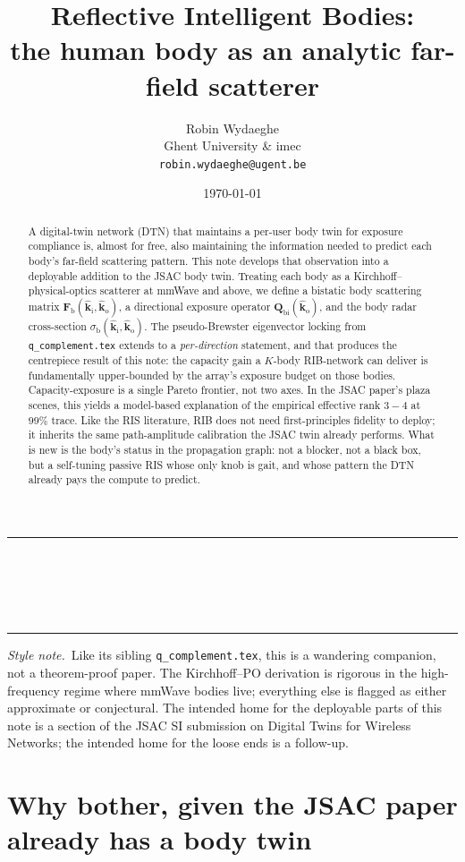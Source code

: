 \documentclass[11pt,a4paper]{article}
\title{\textbf{Reflective Intelligent Bodies:\\
the human body as an analytic far-field scatterer}}
\author{Robin Wydaeghe\\
 Ghent University \& imec\\
 \texttt{robin.wydaeghe@ugent.be}}
\date{\today}
\makeatletter
\theoremstyle{definition}
\newcommand{\kin}{\hat{\bm{k}}_{\mathrm{i}}}
\newcommand{\kout}{\hat{\bm{k}}_{\mathrm{o}}}
\newcommand{\Frib}{\mathbf{F}_{\mathrm{b}}}
\newcommand{\sigb}{\sigma_{\mathrm{b}}}
\newcommand{\Qbist}{\mathbf{Q}_{\mathrm{bi}}}
\renewcommand{\maketitle}{%
  \thispagestyle{plain}%
  \begin{center}
    \rule{\linewidth}{1pt}\\[0.4em]
    {\LARGE\bfseries \@title}\\[0.5em]
    {\large \@author}\\[0.3em]
    {\small \@date}\\[0.4em]\rule{\linewidth}{1pt}
  \end{center}
  \vspace{0.5em}
}
\makeatother
\begin{document}
\maketitle

\begin{abstract}
A digital-twin network (DTN) that maintains a per-user body twin for
exposure compliance is, almost for free, also maintaining the
information needed to predict each body's far-field scattering
pattern.  This note develops that observation into a deployable
addition to the JSAC body twin.  Treating each body as a
Kirchhoff--physical-optics scatterer at mmWave and above, we define a
bistatic body scattering matrix $\Frib(\kin,\kout)$, a directional
exposure operator $\Qbist(\kout)$, and the body radar cross-section
$\sigb(\kin,\kout)$.  The pseudo-Brewster eigenvector locking from
\texttt{q\_complement.tex} extends to a \emph{per-direction}
statement, and that produces the centrepiece result of this note:
the capacity gain a $K$-body RIB-network can deliver is fundamentally
upper-bounded by the array's exposure budget on those bodies.
Capacity-exposure is a single Pareto frontier, not two axes.  In the
JSAC paper's plaza scenes, this yields a model-based explanation of
the empirical effective rank $3{-}4$ at $99\%$ trace.  Like the RIS
literature, RIB does not need first-principles fidelity to deploy; it
inherits the same path-amplitude calibration the JSAC twin already
performs.  What is new is the body's status in the propagation graph:
not a blocker, not a black box, but a self-tuning passive RIS whose
only knob is gait, and whose pattern the DTN already pays the
compute to predict.
\end{abstract}

\vspace{0.3em}
\noindent\textit{Style note.}~Like its sibling
\texttt{q\_complement.tex}, this is a wandering companion, not a
theorem-proof paper.  The Kirchhoff--PO derivation is rigorous in
the high-frequency regime where mmWave bodies live; everything
else is flagged as either approximate or conjectural.  The intended
home for the deployable parts of this note is a section of the
JSAC SI submission on Digital Twins for Wireless Networks; the
intended home for the loose ends is a follow-up.

\tableofcontents
\bigskip

\section{Why bother, given the JSAC paper already has a body twin}
\end{document}
